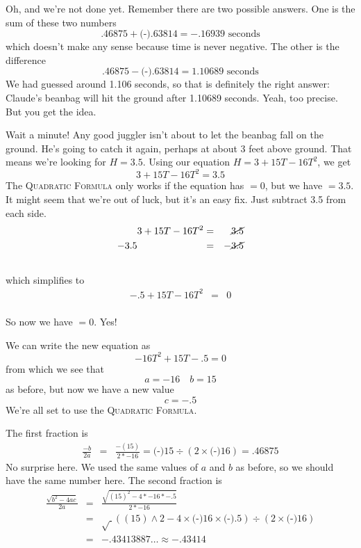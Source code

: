 Oh, and we're not done yet.  Remember there are two possible answers.  One is the sum of these two numbers 
$$ .46875 +  \text{(-)}.63814 = -.16939 \text{ seconds}$$ 
which doesn't make any sense because time is never negative.  The other is the difference
$$.46875 -  \text{(-)}.63814 = 1.10689 \text{ seconds}$$  
We had guessed around 1.106 seconds, so that is definitely the right answer:  Claude's beanbag will hit the ground after 1.10689 seconds.  Yeah, too precise.  But you get the idea.

Wait a minute!  Any good juggler isn't about to let the beanbag fall on the ground.  He's going to catch it again, perhaps at about 3 feet above ground.  
That means we're looking for $H=3.5$.  Using our equation $H=3+15T-16T^2$, we get $$3+15T-16T^2=3.5$$ The \textsc{Quadratic Formula} only works if the equation has $=0$, but we have $=3.5$.  It might seem that we're out of luck, but it's an easy fix.  Just subtract 3.5 from each side. 
\begin{eqnarray} \nonumber
3+15T-16T^2 & = & \cancel{3.5} \\ \nonumber
-3.5 \hspace{.9in}~ & = &-\cancel{3.5}\\ \nonumber %
\end{eqnarray}
which simplifies to
\begin{eqnarray} \nonumber
-.5+15T -16T^2 & = & 0 \\ \nonumber
\end{eqnarray}
\vspace{-.5in} %

\noindent So now we have $=0$.  Yes!

We can write the new equation as $$-16T^2 + 15T -.5= 0$$ from which we see that $$a = -16 \quad b = 15$$ as before, but now we have a new value $$c=-.5$$   We're all set to use the \textsc{Quadratic Formula}.  

The first fraction is 
 \begin{eqnarray*}
\frac{-b}{2a} & = &  \frac{-(15)}{2 \ast -16} =  \text{(-)}15 \div (2 \times  \text{(-)}16) = .46875
\end{eqnarray*}
No surprise here.  We used the same values of $a$ and $b$ as before, so we should have the same number here.
The second fraction is \begin{eqnarray*}
\frac{\sqrt{b^2-4ac}}{2a} & = &   \frac{\sqrt{(15)^2-4 \ast -16 \ast -.5}}{2 \ast-16}\\
& = &   \sqrt{~} ( (15) \wedge 2 - 4 \times  \text{(-)}16 \times  \text{(-)}.5) \div (2 \times  \text{(-)}16)\\
& =  & -.43413887\ldots \approx -.43414
\end{eqnarray*}

